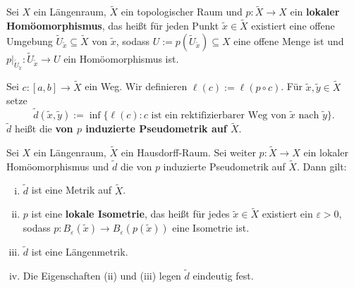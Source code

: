 \begin{definition}
\label{def:2.23}
	Sei $X$ ein Längenraum, $\tilde{X}$ ein topologischer Raum und $p \colon \tilde{X} \rightarrow X$ ein \textbf{lokaler Homöomorphismus}, das heißt für jeden Punkt $\tilde{x} \in \tilde{X}$ existiert eine offene Umgebung $\tilde{U}_{\tilde{x}} \subseteq \tilde{X}$ von $\tilde{x}$, sodass $U := p(\tilde{U}_{\tilde{x}}) \subseteq X$ eine offene Menge ist und $p \big|_{\tilde{U}_{\tilde{x}}}\colon \tilde{U}_{\tilde{x}} \rightarrow U$ ein Homöomorphismus ist. 
	
	Sei $c \colon [a,b] \rightarrow \tilde{X}$ ein Weg.
	Wir definieren $\ell(c) := \ell(p \circ c)$.
	Für $\tilde{x}, \tilde{y} \in \tilde{X}$ setze
	\[
		\tilde{d}(\tilde{x},\tilde{y}) := \inf \{ \ell(c) : c \text{ ist ein rektifizierbarer Weg von } \tilde{x} \text{ nach } \tilde{y}\}.
	\]
	$\tilde{d}$ heißt die \textbf{von $p$ induzierte Pseudometrik auf $\tilde{X}$}. 
\end{definition}

\begin{satz}
\label{satz:2.24}
	Sei $X$ ein Längenraum, $\tilde{X}$ ein Hausdorff-Raum.
	Sei weiter $p \colon \tilde{X} \rightarrow X$ ein lokaler Homöomorphismus und $\tilde{d}$ die von $p$ induzierte Pseudometrik auf $\tilde{X}$.
	Dann gilt:
	\begin{enumerate}[(i)]
		\item $\tilde{d}$ ist eine Metrik auf $\tilde{X}$.
		\item $p$ ist eine \textbf{lokale Isometrie}, das heißt für jedes $\tilde{x} \in \tilde{X}$ existiert ein $\varepsilon > 0$, sodass $p \colon B_\varepsilon(\tilde{x}) \rightarrow B_\varepsilon(p(\tilde{x}))$ eine Isometrie ist. 
		\item $\tilde{d}$ ist eine Längenmetrik.
		\item Die Eigenschaften (ii) und (iii) legen $\tilde{d}$ eindeutig fest.
	\end{enumerate}
\end{satz}

